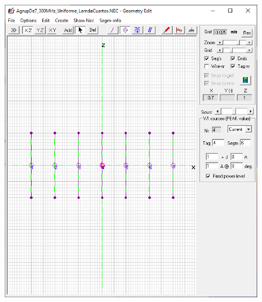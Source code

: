\documentclass[11pt]{book}
\begin{document}
\begin{figure}[h]
{		\includegraphics[scale=0.30]{IMAGENES/a42}\label{a42}}	
	 \\

\end{figure}
\end{document}
